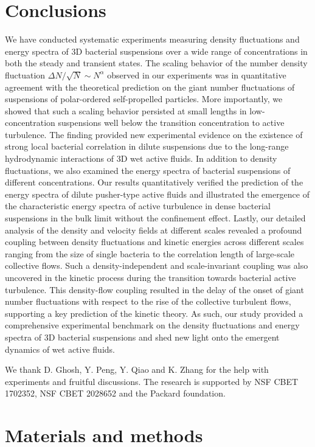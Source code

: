 \documentclass[twocolumn,aps,prx,amsmath,amssymb,longbibliography]{revtex4-2}
\begin{document}
\section{Conclusions}

We have conducted systematic experiments measuring density fluctuations and energy spectra of 3D bacterial suspensions over a wide range of concentrations in both the steady and transient states. The scaling behavior of the number density fluctuation $\Delta N/\sqrt N \sim N^\alpha$ observed in our experiments was in quantitative agreement with the theoretical prediction on the giant number fluctuations of suspensions of polar-ordered self-propelled particles. More importantly, we showed that such a scaling behavior persisted at small lengths in low-concentration suspensions well below the transition concentration to active turbulence. The finding provided new experimental evidence on the existence of strong local bacterial correlation in dilute suspensions due to the long-range hydrodynamic interactions of 3D wet active fluids. In addition to density fluctuations, we also examined the energy spectra of bacterial suspensions of different concentrations. Our results quantitatively verified the prediction of the energy spectra of dilute pusher-type active fluids and illustrated the emergence of the characteristic energy spectra of active turbulence in dense bacterial suspensions in the bulk limit without the confinement effect. Lastly, our detailed analysis of the density and velocity fields at different scales revealed a profound coupling between density fluctuations and kinetic energies across different scales ranging from the size of single bacteria to the correlation length of large-scale collective flows. Such a density-independent and scale-invariant coupling was also uncovered in the kinetic process during the transition towards bacterial active turbulence. This density-flow coupling resulted in the delay of the onset of giant number fluctuations with respect to the rise of the collective turbulent flows, supporting a key prediction of the kinetic theory. As such, our study provided a comprehensive experimental benchmark on the density fluctuations and energy spectra of 3D bacterial suspensions and shed new light onto the emergent dynamics of wet active fluids. \\

\begin{acknowledgements}
	We thank D. Ghosh, Y. Peng, Y. Qiao and K. Zhang for the help with experiments and fruitful discussions. The research is supported by NSF CBET 1702352, NSF CBET 2028652 and the Packard foundation.
\end{acknowledgements}

\appendix
\section{Materials and methods} \label{appendix}



\end{document}
